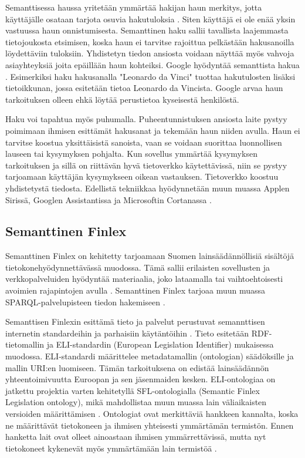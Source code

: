 \documentclass[finnish, 12pt, a4paper, elec, utf8, pdfa, online]{aaltothesis}
\begin{document}
{Semanttisessa haussa yritetään ymmärtää hakijan haun merkitys, jotta käyttäjälle osataan tarjota osuvia hakutuloksia \cite{profium_search}. Siten käyttäjä ei ole enää yksin vastuussa haun onnistumisesta. Semanttinen haku sallii tavallista laajemmasta tietojoukosta etsimisen, koska haun ei tarvitse rajoittua pelkästään hakusanoilla löydettäviin tuloksiin. Yhdistetyn tiedon ansiosta voidaan näyttää myös vahvoja asiayhteyksiä joita epäillään haun kohteiksi. Google hyödyntää semanttista hakua \cite{knowledge_graph}  \cite{linked_data_finlad}. Esimerkiksi haku hakusanalla "Leonardo da Vinci" tuottaa hakutulosten lisäksi tietoikkunan, jossa esitetään tietoa Leonardo da Vincista. Google arvaa haun tarkoituksen olleen ehkä löytää perustietoa kyseisestä henkilöstä.

Haku voi tapahtua myös puhumalla. Puheentunnistuksen ansiosta laite pystyy poimimaan ihmisen esittämät hakusanat ja tekemään haun niiden avulla. Haun ei tarvitse koostua yksittäisistä sanoista, vaan se voidaan suorittaa luonnollisen lauseen tai kysymyksen pohjalta. Kun sovellus ymmärtää kysymyksen tarkoituksen ja sillä on riittävän hyvä tietoverkko käytettävissä, niin se pystyy tarjoamaan käyttäjän kysymykseen oikean vastauksen. Tietoverkko koostuu yhdistetystä tiedosta. Edellistä tekniikkaa hyödynnetään muun muassa Applen Sirissä, Googlen Assistantissa ja Microsoftin Cortanassa \cite{siri} \cite{assistant} \cite{cortana}.

\subsection{Semanttinen Finlex}
Semanttinen Finlex on kehitetty tarjoamaan Suomen lainsäädännöllisiä sisältöjä tietokonehyödynnettävässä muodossa. Tämä sallii erilaisten sovellusten ja verkkopalveluiden hyödyntää materiaalia, joko lataamalla tai vaihtoehtoisesti avoimien rajapintojen avulla \cite{finlex}. Semanttinen Finlex tarjoaa muun muassa SPARQL-palvelupisteen tiedon hakemiseen \cite{finlex2}.

Semanttisen Finlexin esittämä tieto ja palvelut perustuvat semannttisen internetin standardeihin ja parhaisiin käytäntöihin \cite{finlex2}. Tieto esitetään RDF-tietomallin ja ELI-standardin (European Legislation Identifier) mukaisessa muodossa. ELI-standardi määrittelee metadatamallin (ontologian) säädöksille ja mallin URI:en luomiseen. Tämän tarkoituksena on edistää lainsäädännön yhteentoimivuutta Euroopan ja sen jäsenmaiden kesken. ELI-ontologiaa on jatkettu projektia varten kehitetyllä SFL-ontologialla (Semantic Finlex Legislation ontology), mikä mahdollistaa muun muassa lain väliaikaisten versioiden määrittämisen \cite{finlex3}. Ontologiat ovat merkittäviä hankkeen kannalta, koska ne määrittävät tietokoneen ja ihmisen yhteisesti ymmärtämän termistön. Ennen hanketta lait ovat olleet ainoastaan ihmisen ymmärrettävissä, mutta nyt tietokoneet kykenevät myös ymmärtämään lain termistöä \cite{finlex}.

}
\end{document}
